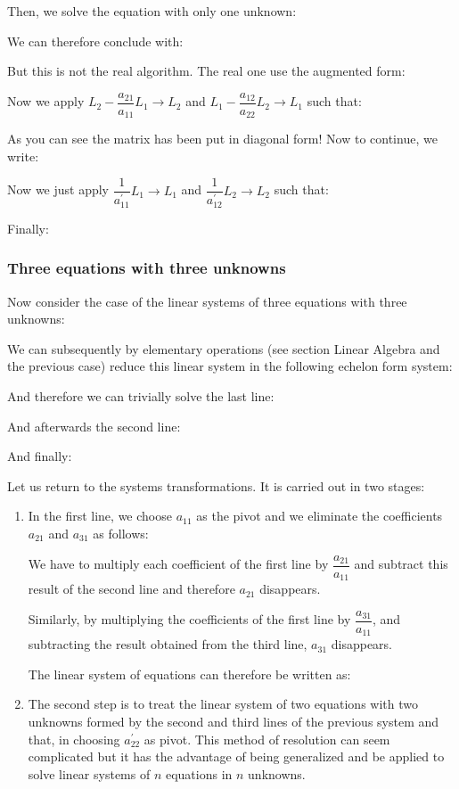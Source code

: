 		Then, we solve the equation with only one unknown:
		
		We can therefore conclude with:
		
		But this is not the real algorithm. The real one use the augmented form:
		
		 Now we apply $L_2-\dfrac{a_{21}}{a_{11}}L_1\rightarrow L_2$ and $L_1-\dfrac{a_{12}}{a_{22}}L_2 \rightarrow L_1$ such that:
		
		As you can see the matrix has been put in diagonal form!
		Now to continue, we write:
		
		
		Now we just apply $\dfrac{1}{a_{11}^{'}}L_1 \rightarrow L_1$ and  $\dfrac{1}{a_{12}^{'}}L_2 \rightarrow L_2$ such that:
		
		Finally:
		
		
		\subsubsection{Three equations with three unknowns}
	Now consider the case of the linear systems of three equations with three unknowns:
		
	We can subsequently by elementary operations (see section Linear Algebra and the previous case) reduce this linear system in the following echelon form system:
		
		And therefore we can trivially solve the last line:
		
		And afterwards the second line:
		
		And finally:
		
		Let us return to the systems transformations. It is carried out in two stages:
		\begin{enumerate}
			\item In the first line, we choose $a_{11}$ as the pivot and we eliminate the coefficients $a_{21}$ and $a_{31}$ as follows:
			
			We have to multiply each coefficient of the first line by $\dfrac{a_{21}}{a_{11}}$ and subtract this result of the second line and therefore $a_{21}$ disappears.
			
			Similarly, by multiplying the coefficients of the first line by $\dfrac{a_{31}}{a_{11}}$, and subtracting the result obtained from the third line, $a_{31}$ disappears.
			
			The linear system of equations can therefore be written as:
			
			\item The second step is to treat the linear system of two equations with two unknowns formed by the second and third lines of the previous system and that, in choosing $a_{22}^{'}$ as pivot. This method of resolution can seem complicated but it has the advantage of being generalized and be applied to solve linear systems of $n$ equations in $n$ unknowns.
		\end{enumerate}
		
